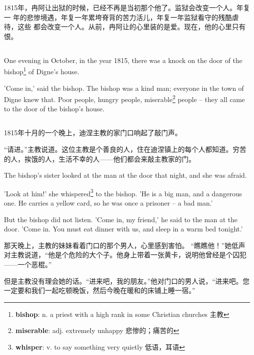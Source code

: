 \documentclass[fontset=ubuntu, zihao=5]{ctexart}
\begin{document}
\begin{paracol}{2}
  1815年，冉阿让出狱的时候，已经不再是当初那个他了。监狱会改变一个人。年复一
  年的悲惨境遇，年复一年累垮脊背的苦力活儿，年复一年监狱看守的残酷虐待，这些
  都会改变一个人。从前，冉阿让的心里装的是爱。现在，他的心里只有
  恨。

  \switchcolumn*

  \subsection{}

  One evening in October, in the year 1815, there was a knock on the door of
  the bishop\footnote{\textbf{bishop}: n. a priest with a high rank in some Christian churches 主教} of Digne's house.

  'Come in,' said the bishop. The bishop was a kind man; everyone in the town of Digne knew that. Poor people, hungry people, miserable\footnote{\textbf{miserable}: adj. extremely unhappy 悲惨的；痛苦的} people – they all came to the door of the bishop's house.

  \switchcolumn

  \subsection*{}

  1815年十月的一个晚上，迪涅主教的家门口响起了敲门声。

  “请进。”主教说道。这位主教是个善良的人，住在迪涅镇上的每个人都知道。穷苦
  的人，挨饿的人，生活不幸的人——他们都会来敲主教家的门。

\switchcolumn*

  The bishop's sister looked at the man at the door that night, and she was afraid.

  'Look at him!' she whispered\footnote{\textbf{whisper}: v. to say something very quietly 低语，耳语} to the bishop. 'He is a big man, and a dangerous one. He carries a yellow card, so he was once a prisoner – a bad man.'

  But the bishop did not listen. 'Come in, my friend,' he said to the man at the door. 'Come in. You must eat dinner with us, and sleep in a warm bed tonight.'

\switchcolumn

  那天晚上，主教的妹妹看着门口的那个男人，心里感到害怕。
  “瞧瞧他！”她低声对主教说道，“他是个危险的大个子。他身上带着一张黄卡，说明他曾经是个囚犯——一个恶棍。”


  但是主教没有理会她的话。“进来吧，我的朋友。”他对门口的男人说，“进来吧。您一定要和我们一起吃顿晚饭，然后今晚在暖和的床铺上睡一宿。”


\end{paracol}
\end{document}
